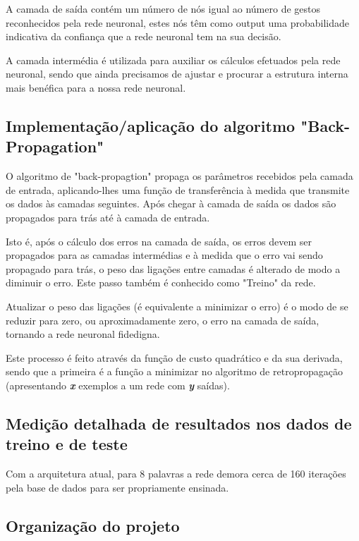 \documentclass[10pt,a4paper]{article}
\begin{document}

A camada de saída contém um número de nós igual ao número de gestos reconhecidos pela rede neuronal, estes nós têm como output uma probabilidade indicativa da confiança que a rede neuronal tem na sua decisão.

A camada intermédia é utilizada para auxiliar os cálculos efetuados pela rede neuronal, sendo que ainda precisamos de ajustar e procurar a estrutura interna mais benéfica para a nossa rede neuronal.

\subsection{Implementação/aplicação do algoritmo "Back-Propagation"}
\subitem

O algoritmo de "back-propagtion" propaga os parâmetros recebidos pela camada de entrada, aplicando-lhes uma função de transferência à medida que transmite os dados às camadas seguintes. Após chegar à camada de saída os dados são propagados para trás até à camada de entrada.

Isto é, após o cálculo dos erros na camada de saída, os erros devem ser propagados para as camadas intermédias e à medida que o erro vai sendo propagado para trás, o peso das ligações entre camadas é alterado de modo a diminuir o erro. Este passo também é conhecido como "Treino" da rede.

Atualizar o peso das ligações (é equivalente a minimizar o erro) é o modo de se reduzir para zero, ou aproximadamente zero, o erro na camada de saída, tornando a rede neuronal fidedigna.

Este processo é feito através da função de custo quadrático e da sua derivada, sendo que a primeira é a função a minimizar no algoritmo de retropropagação (apresentando \textbf{\textit{x}} exemplos a um rede com \textbf{\textit{y}} saídas).


\subsection{Medição detalhada de resultados nos dados de treino e de teste}
\subitem

Com a arquitetura atual, para 8 palavras a rede demora cerca de 160 iterações pela base de dados para ser propriamente ensinada.

\subsection{Organização do projeto}
\subitem
\end{document}
